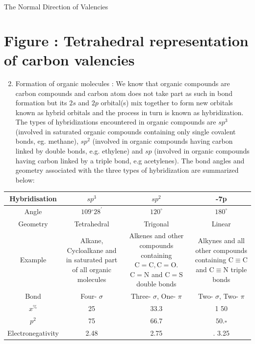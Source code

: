 \documentclass[10pt]{article}
\begin{document}
The Normal Direction of Valencies

\section*{Figure : Tetrahedral representation of carbon valencies}
\begin{enumerate}
  \setcounter{enumi}{1}
  \item Formation of organic molecules : We know that organic compounds are carbon compounds and carbon atom does not take part as such in bond formation but its $2 s$ and $2 p$ orbital(s) mix together to form new orbitals known as hybrid orbitals and the process in turn is known as hybridization. The types of hybridizations encountered in organic compounds are $s p^{3}$ (involved in saturated organic compounds containing only single covalent bonds, eg. methane), $s p^{2}$ (involved in organic compounds having carbon linked by double bonds, e.g. ethylene) and $s p$ (involved in organic compounds having carbon linked by a triple bond, e.g acetylenes). The bond angles and geometry associated with the three types of hybridization are summarized below:
\end{enumerate}

\begin{center}
\begin{tabular}{|c|c|c|c|}
\hline
Hybridisation & $s p^{3}$ & $s p^{2}$ & -7p \\
\hline
Angle & $109{ }^{\circ} 28^{\prime}$ & $120^{\circ}$ & $180^{\circ}$ \\
\hline
Geometry & Tetrahedral & Trigonal & Linear \\
\hline
Example & Alkane, Cycloalkane and in saturated part of all organic molecules & Alkenes and other compounds containing $\mathrm{C}=\mathrm{C}, \mathrm{C}=\mathrm{O}$. $\mathrm{C}=\mathrm{N}$ and $\mathrm{C}=\mathrm{S}$ double bonds & Alkynes and all other compounds containing $\mathrm{C} \equiv \mathrm{C}$ and $\mathrm{C} \equiv \mathrm{N}$ triple bonds \\
\hline
Bond & Four- $\sigma$ & Three- $\sigma$, One- $\pi$ & Two- $\sigma$, Two- $\pi$ \\
\hline
$x^{\%}$ & 25 & 33.3 & 1 50 \\
\hline
$p^{2}$ & 75 & 66.7 & $50 . \square$ \\
\hline
Electronegativity & 2.48 & 2.75 & . 3.25 \\
\hline
\end{tabular}
\end{center}
\end{document}
